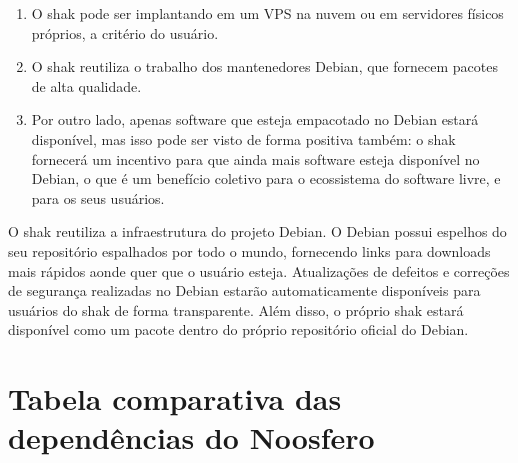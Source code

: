 \begin{anexosenv}
\begin{enumerate}
  \item O shak pode ser implantando em um VPS na nuvem ou em servidores físicos
  próprios, a critério do usuário.
  \item O shak reutiliza o trabalho dos mantenedores Debian, que fornecem pacotes
  de alta qualidade.
  \item Por outro lado, apenas software que esteja empacotado no Debian estará
  disponível, mas isso pode ser visto de forma positiva também: o shak
  fornecerá um incentivo para que ainda mais software esteja disponível no
  Debian, o que é um benefício coletivo para o ecossistema do software livre, e
  para os seus usuários.
\end{enumerate}

O shak reutiliza a infraestrutura do projeto Debian. O Debian possui espelhos 
do seu repositório espalhados por todo o mundo, fornecendo links para 
downloads mais rápidos aonde quer que o usuário esteja. Atualizações de 
defeitos e correções de segurança realizadas no Debian estarão automaticamente 
disponíveis para usuários do shak de forma transparente. Além disso, o 
próprio shak estará disponível como um pacote dentro do próprio repositório oficial do Debian.

\chapter{Tabela comparativa das dependências do Noosfero}


\end{anexosenv}
